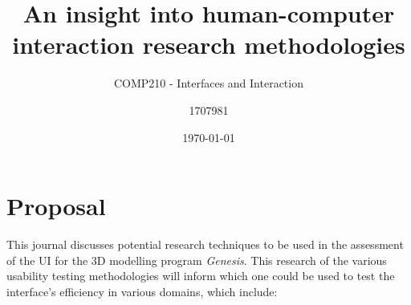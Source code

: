 \documentclass{scrartcl}
\title{An insight into human-computer interaction research methodologies}
\subtitle{COMP210 - Interfaces and Interaction}
\date{\today}
\author{1707981}
\begin{document}
\maketitle
{}





\section{Proposal}
This journal discusses potential research techniques to be used in the assessment of the UI for the 3D modelling program \textit{Genesis}. This research of the various usability testing methodologies will inform which one could be used to test the interface's efficiency in various domains, which include:
\end{document}
